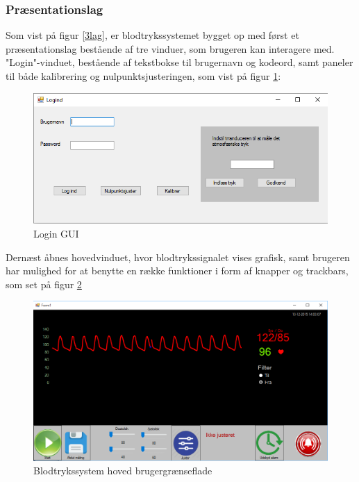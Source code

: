 \subsubsection{Præsentationslag}\label{praesentationslag}

Som vist på figur \ref{3lag}, er blodtrykssystemet bygget op med først et præsentationslag bestående af tre vinduer, som brugeren kan interagere med.\\
"Login"\--vinduet, bestående af tekstbokse til brugernavn og kodeord, samt paneler til både kalibrering og nulpunktsjusteringen, som vist på figur \ref{LoginGUI}:

\begin{figure}[H]
	\centering
	\includegraphics[width=1\textwidth]{Figurer/SoftwareImplementering/Logind}
	\caption{Login GUI}
	\label{LoginGUI}
\end{figure}
Dernæst åbnes hovedvinduet, hvor blodtrykssignalet vises grafisk, samt brugeren har mulighed for at benytte en række funktioner i form af knapper og trackbars, som set på figur \ref{form1}

\begin{figure}[H]
	\centering
	\includegraphics[width=1\textwidth]{Figurer/SoftwareImplementering/blodtryk}
	\caption{Blodtrykssystem hoved brugergrænseflade}
	\label{form1}
\end{figure}

